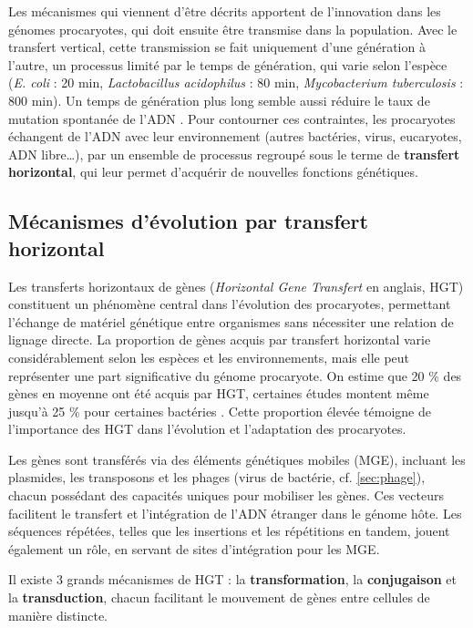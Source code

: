Les mécanismes qui viennent d'être décrits apportent de l'innovation dans les génomes procaryotes, qui doit ensuite être transmise dans la population. Avec le transfert vertical, cette transmission se fait uniquement d'une génération à l'autre, un processus limité par le temps de génération, qui varie selon l'espèce (\textit{E. coli} : 20 min, \textit{Lactobacillus acidophilus} : 80 min, \textit{Mycobacterium tuberculosis} : 800 min). Un temps de génération plus long semble aussi réduire le taux de mutation spontanée de l'ADN \cite{weller_generation-time_2015}. Pour contourner ces contraintes, les procaryotes échangent de l’ADN avec leur environnement (autres bactéries, virus, eucaryotes, ADN libre\dots), par un ensemble de processus regroupé sous le terme de \textbf{transfert horizontal}, qui leur permet d’acquérir de nouvelles fonctions génétiques.

\subsection{Mécanismes d'évolution par transfert horizontal}
\label{sec:evo_hz}

Les transferts horizontaux de gènes (\textit{Horizontal Gene Transfert} en anglais, HGT) constituent un phénomène central dans l'évolution des procaryotes, permettant l'échange de matériel génétique entre organismes sans nécessiter une relation de lignage directe. La proportion de gènes acquis par transfert horizontal varie considérablement selon les espèces et les environnements, mais elle peut représenter une part significative du génome procaryote. On estime que 20 \% des gènes en moyenne ont été acquis par HGT, certaines études montent même jusqu'à 25 \% pour certaines bactéries \cite{ochman_lateral_2000,popa_directed_2011}. Cette proportion élevée témoigne de l'importance des HGT dans l'évolution et l'adaptation des procaryotes.

Les gènes sont transférés via des éléments génétiques mobiles (MGE), incluant les plasmides, les transposons et les phages (virus de bactérie, cf. \autoref{sec:phage}), chacun possédant des capacités uniques pour mobiliser les gènes. Ces vecteurs facilitent le transfert et l'intégration de l'ADN étranger dans le génome hôte. Les séquences répétées, telles que les insertions et les répétitions en tandem, jouent également un rôle, en servant de sites d'intégration pour les MGE. 

Il existe 3 grands mécanismes de HGT : la \textbf{transformation}, la \textbf{conjugaison} et la \textbf{transduction}, chacun facilitant le mouvement de gènes entre cellules de manière distincte.

